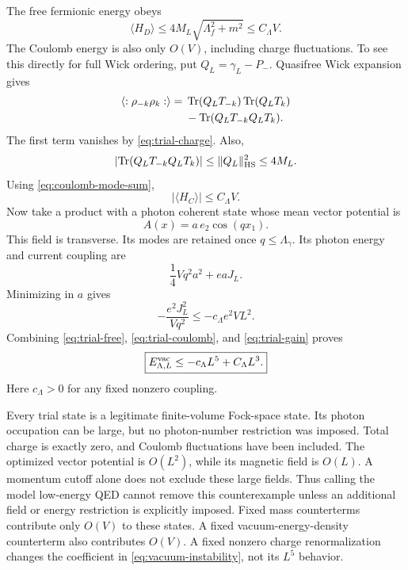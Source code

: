 The free fermionic energy obeys
\begin{equation}
\langle H_D\rangle\le4M_L\sqrt{\Lambda_f^2+m^2}\le C_\Lambda V.
\label{eq:trial-free}
\end{equation}
The Coulomb energy is also only \(O(V)\), including charge fluctuations.
To see this directly for full Wick ordering, put \(Q_L=\gamma_L-P_-\).
Quasifree Wick expansion gives
\begin{equation}
\begin{split}
\langle:\rho_{-k}\rho_k:\rangle
={}&\operatorname{Tr}(Q_LT_{-k})\operatorname{Tr}(Q_LT_k)\\
&-\operatorname{Tr}(Q_LT_{-k}Q_LT_k).
\end{split}
\label{eq:trial-wick}
\end{equation}
The first term vanishes by \eqref{eq:trial-charge}. Also,
\begin{equation}
\left|\operatorname{Tr}(Q_LT_{-k}Q_LT_k)\right|
\le\|Q_L\|_{\mathrm{HS}}^2\le4M_L.
\end{equation}
Using \eqref{eq:coulomb-mode-sum},
\begin{equation}
|\langle H_C\rangle|\le C_\Lambda V.
\label{eq:trial-coulomb}
\end{equation}
Now take a product with a photon coherent state whose mean vector potential is
\begin{equation}
A(x)=a\,e_2\cos(qx_1).
\end{equation}
This field is transverse. Its modes are retained once \(q\le\Lambda_\gamma\).
Its photon energy and current coupling are
\begin{equation}
\frac14Vq^2a^2+eaJ_L.
\end{equation}
Minimizing in \(a\) gives
\begin{equation}
-\frac{e^2J_L^2}{Vq^2}\le-c_\Lambda e^2VL^2.
\label{eq:trial-gain}
\end{equation}
Combining \eqref{eq:trial-free}, \eqref{eq:trial-coulomb}, and
\eqref{eq:trial-gain} proves
\begin{equation}
\boxed{E^{\mathrm{vac}}_{\Lambda,L}\le-c_\Lambda L^5+C_\Lambda L^3.}
\label{eq:vacuum-instability}
\end{equation}
Here \(c_\Lambda>0\) for any fixed nonzero coupling.

Every trial state is a legitimate finite-volume Fock-space state. Its
photon occupation can be large, but no photon-number restriction was
imposed. Total charge is exactly zero, and Coulomb fluctuations have been
included.
The optimized vector potential is \(O(L^2)\), while its magnetic field is
\(O(L)\). A momentum cutoff alone does not exclude these large fields.
Thus calling the model low-energy QED cannot remove this counterexample
unless an additional field or energy restriction is explicitly imposed.
Fixed mass counterterms contribute only \(O(V)\) to these states. A fixed
vacuum-energy-density counterterm also contributes \(O(V)\). A fixed
nonzero charge renormalization changes the coefficient in
\eqref{eq:vacuum-instability}, not its \(L^5\) behavior.

